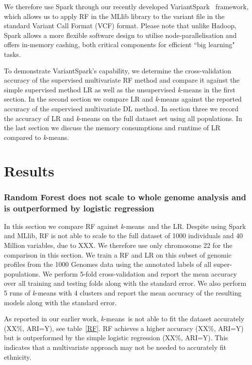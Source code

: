\documentclass{llncs}
\newcommand{\variantSpark}{{\sc VariantSpark}}
\newcommand{\kMeans}{\textit{k}-means}
\begin{document}
{We therefore use {\sc Spark} through our recently developed \variantSpark~\cite{OBrien} framework, which allows us to
apply RF in the {\sc MLlib} library to the variant file in the standard Variant Call Format (VCF) format.  Please note
that unlike {\sc Hadoop}, {\sc Spark} allows a more flexible software design to utilise node-parallelisation and offers
in-memory cashing, both critical components for efficient ``big learning" tasks.

To demonstrate \variantSpark's capability, we determine the cross-validation accuracy of the supervised multivariate RF
method and compare it against the simple supervised method LR as well as the unsupervised \kMeans{} in the first
section.  In the second section we compare LR and \kMeans{} against the reported accuracy of the supervised multivariate
DL method.  In section three we record the accuracy of LR and \kMeans{} on the full dataset set using all populations.
In the last section we discuss the memory consumptions and runtime of LR compared to \kMeans{}.


\section{Results}

\subsubsection{Random Forest does not scale to whole genome analysis and is outperformed by logistic regression}
In this section we compare RF against \kMeans\ and the LR.  
Despite using {\sc Spark} and {\sc MLlib}, RF is not able to scale to the full dataset of 1000 individuals and 40
Million variables, due to XXX.  We therefore use only chromosome 22 for the comparison in this section.  We train a RF
and LR on this subset of genomic profiles from the 1000 Genomes data using the annotated labels of all
super-populations.  We perform 5-fold cross-validation and report the mean accuracy over all training and testing folds
along with the standard error.  We also perform 5 runs of \kMeans{} with 4 clusters and report the mean accuracy of the
resulting models along with the standard error.

As reported in our earlier work, \kMeans\ is not able to fit the dataset accurately (XX\%, ARI=Y), see table~\ref{RF}.
RF achieves a higher accuracy (XX\%, ARI=Y) but is outperformed by the simple logistic regression (XX\%, ARI=Y).
This indicates that a multivariate approach may not be needed to accurately fit ethnicity. 


}
\end{document}
